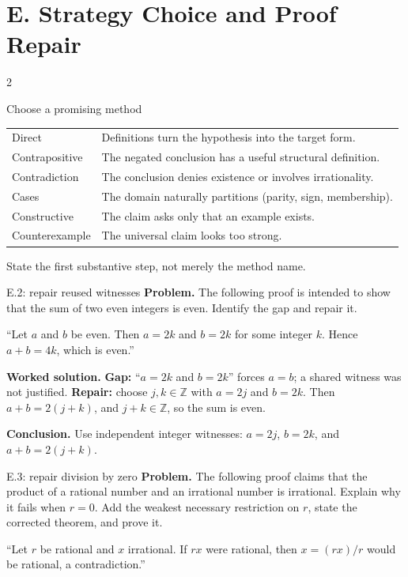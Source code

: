 \documentclass[10pt]{article}
\begin{document}
\section*{E. Strategy Choice and Proof Repair}
\begin{multicols}{2}
\begin{methodbox}{Choose a promising method}
\begin{tabularx}{\linewidth}{@{}lX@{}}
Direct & Definitions turn the hypothesis into the target form.\\
Contrapositive & The negated conclusion has a useful structural definition.\\
Contradiction & The conclusion denies existence or involves irrationality.\\
Cases & The domain naturally partitions (parity, sign, membership).\\
Constructive & The claim asks only that an example exists.\\
Counterexample & The universal claim looks too strong.
\end{tabularx}
State the first substantive step, not merely the method name.
\end{methodbox}

\begin{workedbox}{E.2: repair reused witnesses}
\textbf{Problem.} The following proof is intended to show that the sum of two even integers is even. Identify the gap and repair it.

``Let $a$ and $b$ be even. Then $a=2k$ and $b=2k$ for some integer $k$. Hence $a+b=4k$, which is even.''

\textbf{Worked solution.} \textbf{Gap:} ``$a=2k$ and $b=2k$'' forces $a=b$; a shared witness was not
justified. \textbf{Repair:} choose $j,k\in\mathbb Z$ with $a=2j$ and $b=2k$.
Then $a+b=2(j+k)$, and $j+k\in\mathbb Z$, so the sum is even.

\textbf{Conclusion.} Use independent integer witnesses: $a=2j$, $b=2k$, and $a+b=2(j+k)$.
\end{workedbox}

\begin{workedbox}{E.3: repair division by zero}
\textbf{Problem.} The following proof claims that the product of a rational number and an irrational number is irrational. Explain why it fails when $r=0$. Add the weakest necessary restriction on $r$, state the corrected theorem, and prove it.

``Let $r$ be rational and $x$ irrational. If $rx$ were rational, then $x=(rx)/r$ would be rational, a contradiction.''


\end{workedbox}
\end{multicols}
\end{document}
